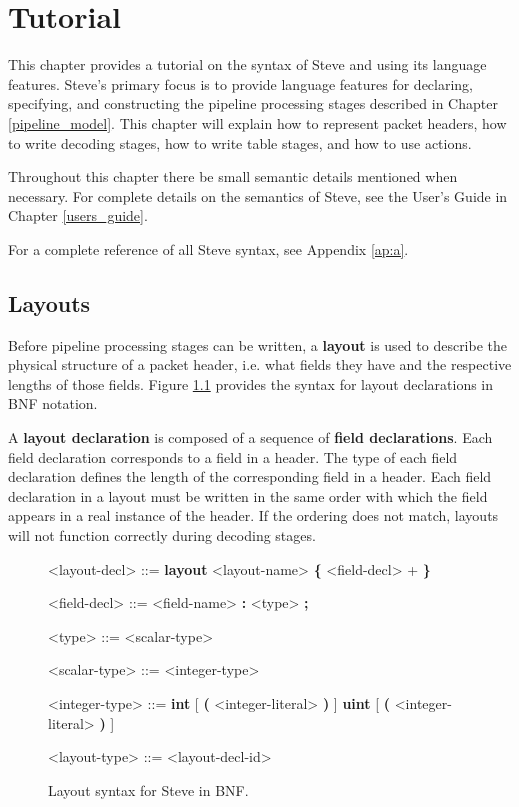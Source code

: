 \chapter{Tutorial} \label{tutorial}

This chapter provides a tutorial on the syntax of Steve and using its language features. Steve's primary focus is to provide language features for declaring, specifying, and constructing the pipeline processing stages described in Chapter \ref{pipeline_model}. This chapter will explain how to represent packet headers, how to write decoding stages, how to write table stages, and how to use actions.

Throughout this chapter there be small semantic details mentioned when necessary. For complete details on the semantics of Steve, see the User's Guide in Chapter \ref{users_guide}.

For a complete reference of all Steve syntax, see Appendix \ref{ap:a}.

\section{Layouts} \label{layout_tut}

Before pipeline processing stages can be written, a \textbf{layout} is used to describe the physical structure of a packet header, i.e. what fields they have and the respective lengths of those fields. Figure \ref{fg:layout_syntax} provides the syntax for layout declarations in BNF notation.

A \textbf{layout declaration} is composed of a sequence of \textbf{field declarations}. Each field declaration corresponds to a field in a header. The type of each field declaration defines the length of the corresponding field in a header. Each field declaration in a layout must be written in the same order with which the field appears in a real instance of the header. If the ordering does not match, layouts will not function correctly during decoding stages. 

\begin{figure}
\begin{mdframed}
\begin{grammar}

<layout-decl> ::=
\textbf{layout} <layout-name> 
\textbf{\{}
	<field-decl> +
\textbf{\}}

<field-decl> ::=
<field-name> \textbf{:} <type> \textbf{;}

<type> ::=
<scalar-type>

<scalar-type> ::= <integer-type>

<integer-type> ::=
\textbf{int} [ \textbf{(} <integer-literal> \textbf{)} ]
\alt \textbf{uint} [ \textbf{(} <integer-literal> \textbf{)} ]

<layout-type> ::=
<layout-decl-id>

\end{grammar}
\end{mdframed}
\caption{Layout syntax for Steve in BNF.}
\label{fg:layout_syntax}
\end{figure}

